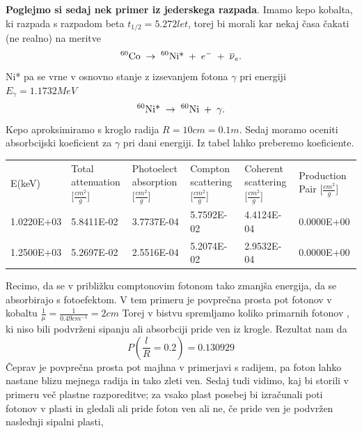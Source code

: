 \documentclass[11pt, a4paper]{article}
\begin{document}
\textbf{Poglejmo si sedaj nek primer iz jederskega razpada}. Imamo kepo kobalta, ki razpada s razpadom beta $t_{1/2} = 5.272 let$, torej bi morali kar nekaj časa čakati (ne realno) na meritve
\begin{equation}
{\displaystyle {}^{60}{\hbox{Co}}\;\to \;^{60}{\hbox{Ni*}}\;+\;e^{-}\;+\;{\overline {\nu }}_{e}.}
\end{equation}
Ni* pa se vrne v osnovno stanje z izsevanjem fotona $\gamma$ pri energiji $E_{\gamma} = 1.1732 MeV$
\begin{equation}
{\displaystyle {}^{60}{\hbox{Ni*}}\;\to \;^{60}{\hbox{Ni}}\;+\;\gamma .}  
\end{equation}
Kepo aproksimiramo s kroglo radija $R = 10cm = 0.1m$. Sedaj moramo oceniti absorbcijski koeficient za $\gamma$ pri dani energiji. Iz tabel lahko preberemo koeficiente.
\begin{table} [H]

\label{my-label}
\resizebox{\textwidth}{!}
{\begin{tabular}{llllll}
\centering

 E(keV)      & Total  attenuation [$\frac{cm^2}{g}$]  & Photoelect absorption [$\frac{cm^2}{g}$]  & Compton    scattering [$\frac{cm^2}{g}$]&    Coherent  scattering [$\frac{cm^2}{g}$] & Production Pair [$\frac{cm^2}{g}$]\\
1.0220E+03 & 5.8411E-02 & 3.7737E-04 & 5.7592E-02 & 4.4124E-04 & 0.0000E+00 \\
  1.2500E+03 & 5.2697E-02 & 2.5516E-04  & 5.2074E-02 & 2.9532E-04  & 0.0000E+00 

\end{tabular}}
\end{table}
Recimo, da se v približku comptonovim fotonom tako zmanjša energija, da se absorbirajo s fotoefektom. V tem primeru je povprečna prosta pot fotonov v kobaltu $\frac{1}{\mu} =\frac{1}{0.49 cm^{-1}} = 2cm$
Torej v bistvu spremljamo koliko primarnih fotonov , ki niso bili podvrženi sipanju ali absorbciji pride ven iz krogle. Rezultat nam da \begin{equation}
P (\frac{l}{R} = 0.2 ) = 0.130929 %
\end{equation}
Čeprav je povprečna prosta pot majhna v primerjavi s radijem, pa foton lahko nastane blizu mejnega radija in tako zleti ven.\newline\newline
Sedaj tudi vidimo, kaj bi storili v primeru več plastne razporeditve; za vsako plast posebej bi izračunali poti fotonov v plasti in gledali ali pride foton ven ali ne, če pride ven je podvržen naslednji sipalni plasti,
\end{document}
